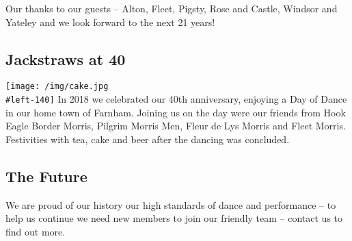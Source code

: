 \documentclass[
]{article}
\begin{document}
Our thanks to our guests -- Alton, Fleet, Pigsty, Rose and Castle,
Windsor and Yateley and we look forward to the next 21 years!

\hypertarget{jackstraws-at-40}{%
\subsection{Jackstraws at 40}\label{jackstraws-at-40}}

\texttt{[image: /img/cake.jpg\\\#left-140]} In 2018 we celebrated our 40th
anniversary, enjoying a Day of Dance in our home town of Farnham.
Joining us on the day were our friends from Hook Eagle Border Morris,
Pilgrim Morris Men, Fleur de Lys Morris and Fleet Morris. Festivities
with tea, cake and beer after the dancing was concluded.

\hypertarget{the-future}{%
\subsection{The Future}\label{the-future}}

We are proud of our history our high standards of dance and performance
-- to help us continue we need new members to join our friendly team --
contact us to find out more.
\end{document}
